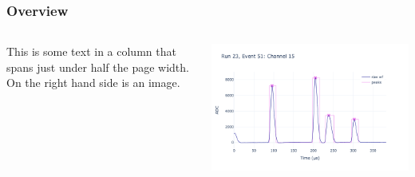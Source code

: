 \begin{frame}
	\frametitle{Overview}
	\begin{columns}

		This is some text in a column that spans just under half the page width. On the right hand side is an image.

		\includegraphics[width=\textwidth]{figs/logo.png}
	\end{columns}
\end{frame}